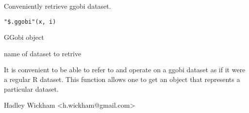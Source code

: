 \documentclass{article}
\begin{document}
\aliasA{[.ggobi}{"\$.ggobi"}{[.ggobi}
\begin{Description}\relax
Conveniently retrieve ggobi dataset.
\end{Description}
\begin{Usage}
\begin{verbatim}"$.ggobi"(x, i)\end{verbatim}
\end{Usage}
\begin{Arguments}
\begin{ldescription}
\item[\code{x}] GGobi object
\item[\code{i}] name of dataset to retrive
\end{ldescription}
\end{Arguments}
\begin{Details}\relax
It is convenient to be able to refer to and operate on a ggobi
dataset as if it were a regular R dataset.  This function allows one to
get an  object that represents a particular
dataset.
\end{Details}
\begin{Author}\relax
Hadley Wickham <h.wickham@gmail.com>
\end{Author}
\begin{Examples}
\end{Examples}
\end{document}
